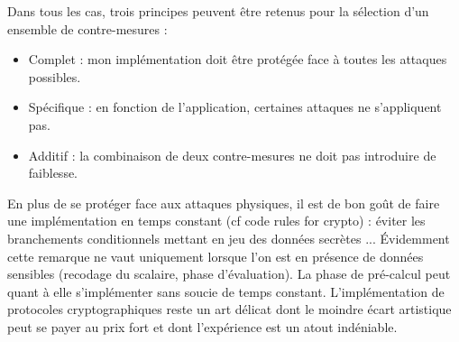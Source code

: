 Dans tous les cas, trois principes peuvent être retenus pour la sélection d'un ensemble de contre-mesures :
\begin{itemize}
    \item Complet : mon implémentation doit être protégée face à toutes les attaques possibles.
    \item Spécifique : en fonction de l'application, certaines attaques ne s'appliquent pas.
    \item Additif : la combinaison de deux contre-mesures ne doit pas introduire de faiblesse.
\end{itemize}


En plus de se protéger face aux attaques physiques, il est de bon goût de faire une implémentation en temps constant (cf code rules for crypto) : éviter les branchements conditionnels mettant en jeu des données secrètes ... Évidemment cette remarque ne vaut uniquement lorsque l'on est en présence de données sensibles (recodage du scalaire, phase d'évaluation). La phase de pré-calcul peut quant à elle s'implémenter sans soucie de temps constant. L'implémentation de protocoles cryptographiques reste un art délicat dont le moindre écart artistique peut se payer au prix fort et dont l'expérience est un atout indéniable.
